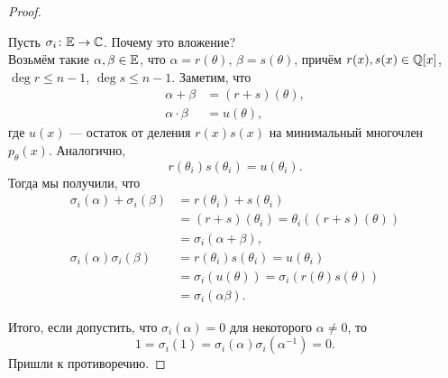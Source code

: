 \begin{proof}
\begin{statesp}
        \item
        Пусть $\sigma_i\colon \mathbb{E} \to \mathbb{C}$. Почему это вложение?\\
            Возьмём такие $\alpha, \beta \in \mathbb{E}$, что $\alpha = r(\theta)$, $\beta = s(\theta)$, причём $r(x), s(x) \in \mathbb{Q}[x]$, $\deg{r} \le n-1$, $\deg{s} \le n-1$. Заметим, что
            \begin{align*}
                \alpha + \beta &= (r+s)(\theta), \\
                \alpha \cdot \beta &= u(\theta),
            \end{align*}
            где $u(x)$ --- остаток от деления $r(x)s(x)$ на минимальный многочлен $p_\theta(x)$. Аналогично, 
            \[
                r(\theta_i)s(\theta_i) = u(\theta_i).
            \]
            Тогда мы получили, что
            \begin{align*}
                \sigma_i(\alpha)+\sigma_i(\beta) &= r(\theta_i)+s(\theta_i) \\
                &= (r+s)(\theta_i) = \theta_i((r+s)(\theta)) \\
                &= \sigma_i(\alpha+\beta), \\
                \sigma_i(\alpha)\sigma_i(\beta) &= r(\theta_i)s(\theta_i) = u(\theta_i) \\
                &= \sigma_i(u(\theta)) = \sigma_i(r(\theta)s(\theta)) \\
                &= \sigma_i(\alpha\beta).
            \end{align*}
    \end{statesp}
    Итого, если допустить, что $\sigma_i(\alpha) = 0$ для некоторого $\alpha \ne 0$, то
    \[
        1 = \sigma_i(1) =\sigma_i(\alpha)\sigma_i\left( \alpha^{-1} \right) = 0.
    \]
    Пришли к противоречию.
\end{proof}

